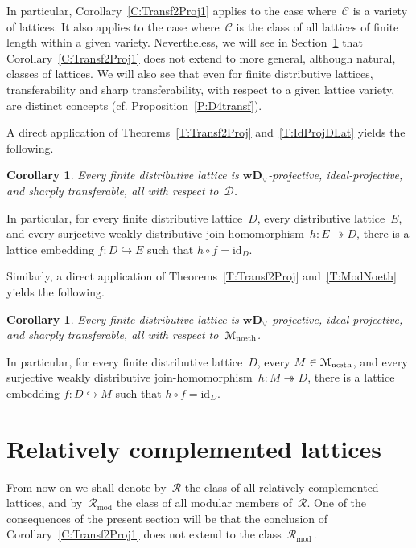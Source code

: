\documentclass[reqno]{amsart}
\numberwithin{equation}{section}
\theoremstyle{plain}
\newtheorem{corollary}[theorem]{Corollary}
\theoremstyle{definition}
\theoremstyle{remark}
\numberwithin{figure}{section}
\numberwithin{table}{section}
\begin{document}
In particular, Corollary~\ref{C:Transf2Proj1} applies to the case where~${\mathcal{C}}$ is a variety of lattices.
It also applies to the case where~${\mathcal{C}}$ is the class of all lattices of finite length within a given variety.
Nevertheless, we will see in Section~\ref{S:RelCpl} that Corollary~\ref{C:Transf2Proj1} does not extend to more general, although natural, classes of lattices.
We will also see that even for finite distributive lattices, transferability and sharp transferability, with respect to a given lattice variety, are distinct concepts (cf. Proposition~\ref{P:D4transf}).

A direct application of Theorems~\ref{T:Transf2Proj} and~\ref{T:IdProjDLat} yields the following.

\begin{corollary}\label{C:IdProjDLat}
Every finite distributive lattice is ${\mathbf{wD}_{\vee}}$-projective, {i\-de\-al-pro\-jec\-tive}, and sharply transferable, all with respect to~${\mathcal{D}}$.
\end{corollary}

In particular, for every finite distributive lattice~$D$, every distributive lattice~$E$, and every surjective weakly distributive {join-ho\-mo\-mor\-phism}\ $h\colon E\twoheadrightarrow D$, there is a lattice embedding $f\colon D\hookrightarrow E$ such that $h\circ f={\mathrm{id}}_D$.

Similarly, a direct application of Theorems~\ref{T:Transf2Proj} and~\ref{T:ModNoeth} yields the following.

\begin{corollary}\label{C:Transf2Proj2}
Every finite distributive lattice is ${\mathbf{wD}_{\vee}}$-projective, {i\-de\-al-pro\-jec\-tive}, and sharply transferable, all with respect to~${{\mathcal{M}}_{\textup{n{\oe}th}}}$.
\end{corollary}

In particular, for every finite distributive lattice~$D$, every $M\in{{\mathcal{M}}_{\textup{n{\oe}th}}}$, and every surjective weakly distributive {join-ho\-mo\-mor\-phism}\ $h\colon M\twoheadrightarrow D$, there is a lattice embedding $f\colon D\hookrightarrow M$ such that $h\circ f={\mathrm{id}}_D$.

\section{Relatively complemented lattices}\label{S:RelCpl}

{}From now on we shall denote by~${\mathcal{R}}$ the class of all relatively complemented lattices, and by~${\mathcal{R}_{\mathrm{mod}}}$ the class of all modular members of~${\mathcal{R}}$.
One of the consequences of the present section will be that the conclusion of Corollary~\ref{C:Transf2Proj1} does not extend to the class~${\mathcal{R}_{\mathrm{mod}}}$\,.
\end{document}

